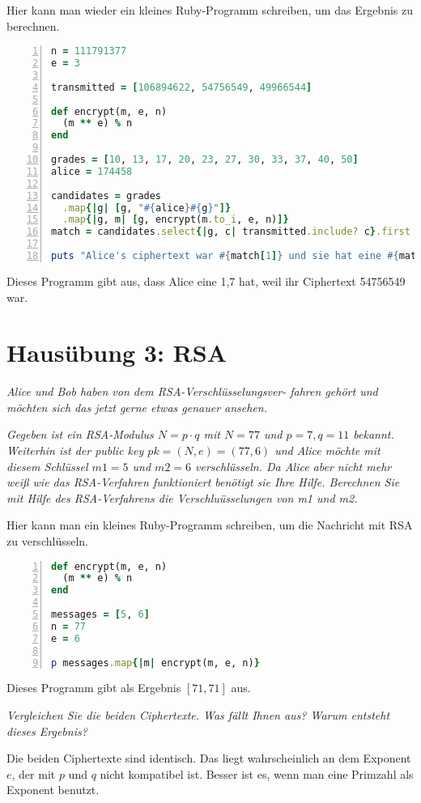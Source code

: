 \documentclass[
  ngerman,
  DIV=12
]{scrartcl}
\begin{document}
Hier kann man wieder ein kleines Ruby-Programm schreiben, um das Ergebnis zu berechnen.
\begin{lstlisting}[language=ruby,numbers=left]
n = 111791377
e = 3

transmitted = [106894622, 54756549, 49966544]

def encrypt(m, e, n)
  (m ** e) % n
end

grades = [10, 13, 17, 20, 23, 27, 30, 33, 37, 40, 50]
alice = 174458

candidates = grades
  .map{|g| [g, "#{alice}#{g}"]}
  .map{|g, m| [g, encrypt(m.to_i, e, n)]}
match = candidates.select{|g, c| transmitted.include? c}.first

puts "Alice's ciphertext war #{match[1]} und sie hat eine #{match[0]}."  
\end{lstlisting}
Dieses Programm gibt aus, dass Alice eine 1,7 hat, weil ihr Ciphertext 54756549 war.

\section*{Hausübung 3: RSA}

\emph{Alice und Bob haben von dem RSA-Verschlüsselungsver- fahren gehört und möchten sich das jetzt gerne etwas genauer ansehen.}

\emph{Gegeben ist ein RSA-Modulus $N = p \cdot q$ mit $N = 77$ und $p = 7, q = 11$ bekannt. Weiterhin ist der public key $pk = (N,e) = (77,6)$ und Alice möchte mit diesem Schlüssel $m1 = 5$ und $m2 = 6$ verschlüsseln. Da Alice aber nicht mehr weiß wie das RSA-Verfahren funktioniert benötigt sie Ihre Hilfe. Berechnen Sie mit Hilfe des RSA-Verfahrens die Verschluüsselungen von m1 und m2.}

Hier kann man ein kleines Ruby-Programm schreiben, um die Nachricht mit RSA zu verschlüsseln.
\begin{lstlisting}[language=ruby,numbers=left]
def encrypt(m, e, n)
  (m ** e) % n
end

messages = [5, 6]
n = 77
e = 6

p messages.map{|m| encrypt(m, e, n)}  
\end{lstlisting}
Dieses Programm gibt als Ergebnis $[71, 71]$ aus.

\emph{Vergleichen Sie die beiden Ciphertexte. Was fällt Ihnen aus? Warum entsteht dieses
Ergebnis?}

Die beiden Ciphertexte sind identisch. Das liegt wahrscheinlich an dem Exponent $e$, der mit $p$ und $q$ nicht kompatibel ist. Besser ist es, wenn man eine Primzahl als Exponent benutzt.
\end{document}
